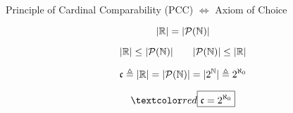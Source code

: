 \begin{frame}{}
  \begin{center}
    {\large {}}
  \end{center}

  \pause
  \vspace{0.50cm}
  \begin{theorem}[PCC]
    \begin{center}
      Principle of Cardinal Comparability (PCC) $\iff$ Axiom of Choice
    \end{center}
  \end{theorem}
\end{frame}

\begin{frame}{}
  \begin{theorem}[UD Theorem $24.11$]
    \[
      |\mathbb{R}| = |\mathcal{P}(\mathbb{N})|
    \]
  \end{theorem}

  \pause
  \[
    |\mathbb{R}| \le |\mathcal{P}(\mathbb{N})|  \qquad |\mathcal{P}(\mathbb{N})| \le |\mathbb{R}|
  \]

  \pause
  \[
    \mathfrak{c} \triangleq |\mathbb{R}| = |\mathcal{P}(\mathbb{N})| = |2^{\mathbb{N}}| \triangleq 2^{\aleph_{0}}
  \]

  \pause
  \[
    \red{\boxed{\mathfrak{c} = 2^{\aleph_{0}}}}
  \]
\end{frame}
